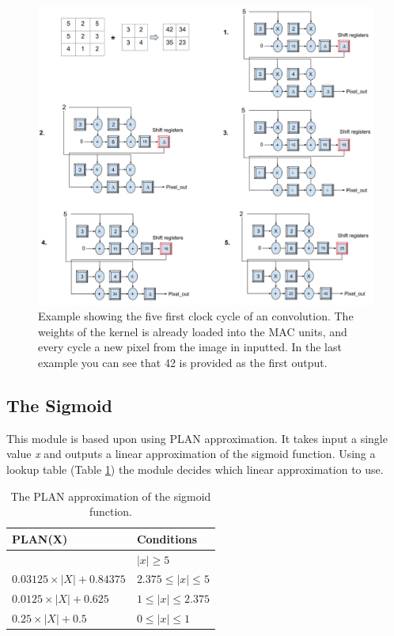 \begin{figure}[h!]
  \centering
      \includegraphics[width=1.1\textwidth]{Figures/Method/Conv_example}
  \caption{Example showing the five first clock cycle of an convolution. The weights of the kernel is already loaded into the MAC units, and every cycle a new pixel from the image in inputted. In the last example you can see that 42 is provided as the first output.}
\end{figure}

\subsection{The Sigmoid} 

This module is based upon \cite{Napocensis2009} using PLAN approximation. It takes input a single value \textit{x} and outputs a linear approximation of the sigmoid function. Using a lookup table (Table \ref{tab_sigmoid}) the module decides which linear approximation to use.


\begin{table}
	\centering
    \begin{tabular}{| >{\centering\arraybackslash}m{2in} | >{\centering\arraybackslash}m{1.2in} |} 
    \hline
    PLAN(X) & Conditions \\ \hline
    1 & $ |x| \geq 5 $ \\ \hline
    $ 0.03125 \times |X| + 0.84375 $ & $ 2.375 \leq |x| \le 5 $\\ \hline
    $ 0.0125 \times |X| + 0.625 $ & $ 1 \leq |x| \le 2.375 $\\ \hline
   	$ 0.25 \times |X| + 0.5 $ & $ 0 \leq |x| \le 1 $\\ \hline
    \end{tabular}
    \caption{The PLAN approximation of the sigmoid function.}
   	\label{tab_sigmoid}
    
\end{table}

